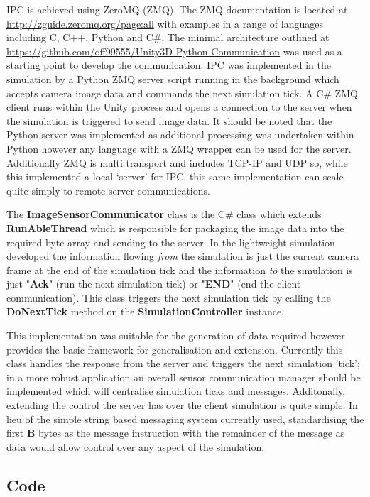 \documentclass{article}
\begin{document}
IPC is achieved using ZeroMQ (ZMQ). The ZMQ documentation is located at \url{http://zguide.zeromq.org/page:all} with examples in a range of languages including C, C++, Python and C\#. The minimal architecture outlined at \url{https://github.com/off99555/Unity3D-Python-Communication} was used as a starting point to develop the communication. IPC was implemented in the simulation by a Python ZMQ server script running in the background which accepts camera image data and commands the next simulation tick. A C\# ZMQ client runs within the Unity process and opens a connection to the server when the simulation is triggered to send image data. It should be noted that the Python server was implemented as additional processing was undertaken within Python however any language with a ZMQ wrapper can be used for the server. Additionally ZMQ is multi transport and includes TCP-IP and UDP so, while this implemented a local `server' for IPC, this same implementation can scale quite simply to remote server communications. 

The \textbf{ImageSensorCommunicator} class is the C\# class which extends \textbf{RunAbleThread} which is responsible for packaging the image data into the required byte array and sending to the server. In the lightweight simulation developed the information flowing \textit{from} the simulation is just the current camera frame at the end of the simulation tick and the information \textit{to} the simulation is just "\textbf{Ack}" (run the next simulation tick) or "\textbf{END}" (end the client communication). This class triggers the next simulation tick by calling the \textbf{DoNextTick} method on the \textbf{SimulationController} instance.

This implementation was suitable for the generation of data required however provides the basic framework for generalisation and extension. Currently this class handles the response from the server and triggers the next simulation 'tick'; in a more robust application an overall sensor communication manager should be implemented which will centralise simulation ticks and messages. Additonally, extending the control the server has over the client simulation is quite simple. In lieu of the simple string based messaging system currently used, standardising the first \textbf{B} bytes as the message instruction with the remainder of the message as data would allow control over any aspect of the simulation. 


\subsection{Code}
\end{document}
